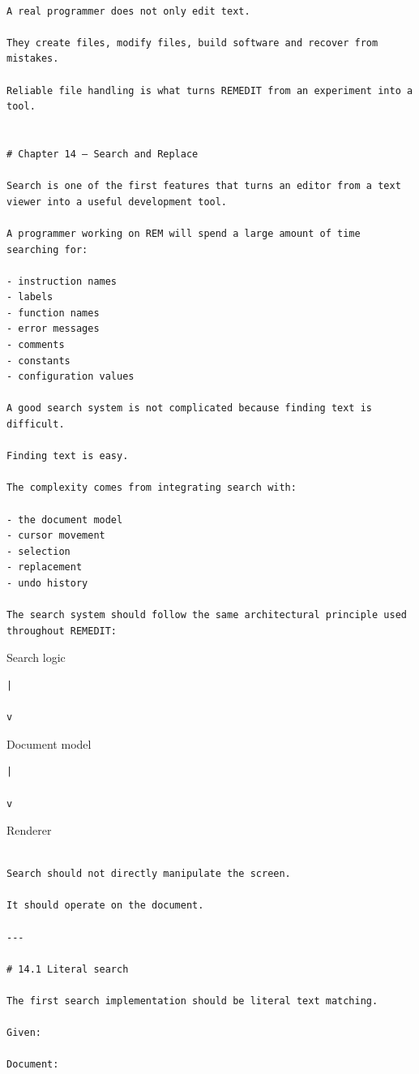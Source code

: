 \documentclass[
  oneside,
  openany]{book}
\begin{document}
\begin{verbatim}

A real programmer does not only edit text.

They create files, modify files, build software and recover from mistakes.

Reliable file handling is what turns REMEDIT from an experiment into a tool.


# Chapter 14 — Search and Replace

Search is one of the first features that turns an editor from a text viewer into a useful development tool.

A programmer working on REM will spend a large amount of time searching for:

- instruction names
- labels
- function names
- error messages
- comments
- constants
- configuration values

A good search system is not complicated because finding text is difficult.

Finding text is easy.

The complexity comes from integrating search with:

- the document model
- cursor movement
- selection
- replacement
- undo history

The search system should follow the same architectural principle used throughout REMEDIT:
\end{verbatim}

Search logic

\begin{verbatim}
|

v
\end{verbatim}

Document model

\begin{verbatim}
|

v
\end{verbatim}

Renderer

\begin{verbatim}

Search should not directly manipulate the screen.

It should operate on the document.

---

# 14.1 Literal search

The first search implementation should be literal text matching.

Given:

Document:
\end{verbatim}
\end{document}

